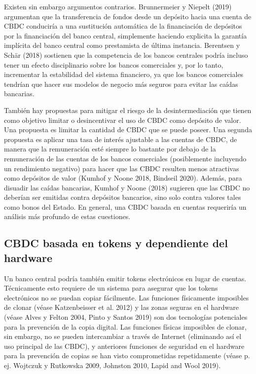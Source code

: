 \documentclass[10pt,spanish]{article}
\begin{document}
Existen sin embargo argumentos contrarios. Brunnermeier y Niepelt (2019)
argumentan que la transferencia de fondos desde un depósito hacia una
cuenta de CBDC conduciría a una sustitución automática de la
financiación de depósitos por la financiación del banco central,
simplemente haciendo explicita la garantía implícita del banco central
como prestamista de última instancia. Berentsen y Schär (2018) sostienen
que la competencia de los bancos centrales podría incluso tener un
efecto disciplinario sobre los bancos comerciales y, por lo tanto,
incrementar la estabilidad del sistema financiero, ya que los bancos
comerciales tendrían que hacer sus modelos de negocio más seguros para
evitar las caídas bancarias.

También hay propuestas para mitigar el riesgo de la desintermediación
que tienen como objetivo limitar o desincentivar el uso de CBDC como
depósito de valor. Una propuesta es limitar la cantidad de CBDC que se
puede poseer. Una segunda propuesta es aplicar una tasa de interés
ajustable a las cuentas de CBDC, de manera que la remuneración esté
siempre lo bastante por debajo de la remuneración de las cuentas de los
bancos comerciales (posiblemente incluyendo un rendimiento negativo)
para hacer que las CBDC resulten menos atractivas como depósitos de
valor (Kumhof y Noone 2018, Bindseil 2020). Además, para disuadir las
caídas bancarias, Kumhof y Noone (2018) sugieren que las CBDC no
deberían ser emitidas contra depósitos bancarios, sino solo contra
valores tales como bonos del Estado. En general, una CBDC basada en
cuentas requeriría un análisis más profundo de estas cuestiones.

\hypertarget{cbdc-basada-en-tokens-y-dependiente-del-hardware}{%
\subsection{CBDC basada en tokens y dependiente del hardware}
\label{cbdc-basada-en-tokens-y-dependiente-del-hardware}}

Un banco central podría también emitir tokens electrónicos en lugar de
cuentas. Técnicamente esto requiere de un sistema para asegurar que los
tokens electrónicos no se puedan copiar fácilmente. Las funciones
físicamente imposibles de clonar (véase Katzenbeisser et al. 2012) y las
zonas seguras en el hardware (véase Alves y Felton 2004, Pinto y Santos
2019) son dos tecnologías potenciales para la prevención de la copia
digital. Las funciones físicas imposibles de clonar, sin embargo, no se
pueden intercambiar a través de Internet (eliminando así el uso
principal de las CBDC), y anteriores funciones de seguridad en el
hardware para la prevención de copias se han visto comprometidas
repetidamente (véase p. ej. Wojtczuk y Rutkowska 2009, Johnston 2010,
Lapid and Wool 2019).
\end{document}
